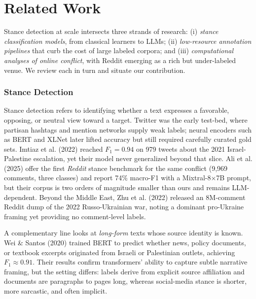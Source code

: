 \documentclass[letterpaper]{article} %
\begin{document}

\section{Related Work}\label{sec:related-work}

Stance detection at scale intersects three strands of research: (i) \textit{stance classification models}, from classical learners to LLMs; (ii) \textit{low-resource annotation pipelines} that curb the cost of large labeled corpora; and (iii) \textit{computational analyses of online conflict}, with Reddit emerging as a rich but under-labeled venue. We review each in turn and situate our contribution.

\subsubsection{Stance Detection}

Stance detection refers to identifying whether a text expresses a favorable, opposing, or neutral view toward a target.  Twitter was the early test-bed, where partisan hashtags and mention networks supply weak labels; neural encoders such as BERT and XLNet later lifted accuracy but still required carefully curated gold sets. Imtiaz et al. (2022) \cite{imtiaz2022taking} reached $F_{1}=0.94$ on 979 tweets about the 2021 Israel-Palestine escalation, yet their model never generalized beyond that slice.  Ali et al. (2025) \cite{ali2025social} offer the first \emph{Reddit} stance benchmark for the same conflict (9,969 comments, three classes) and report 74\% macro-F1 with a Mixtral-8×7B prompt, but their corpus is two orders of magnitude smaller than ours and remains LLM-dependent.  Beyond the Middle East, Zhu et al. (2022) \cite{zhu2022reddit} released an 8M-comment Reddit dump of the 2022 Russo-Ukrainian war, noting a dominant pro-Ukraine framing yet providing no comment-level labels.

A complementary line looks at \emph{long-form} texts whose source identity is known.  Wei \& Santos (2020) \cite{wei2020narrative} trained BERT to predict whether news, policy documents, or textbook excerpts originated from Israeli or Palestinian outlets, achieving $F_{1}\!\approx\!0.91$.  Their results confirm transformers’ ability to capture subtle narrative framing, but the setting differs: labels derive from explicit source affiliation and documents are paragraphs to pages long, whereas social-media stance is shorter, more sarcastic, and often implicit.
\end{document}
